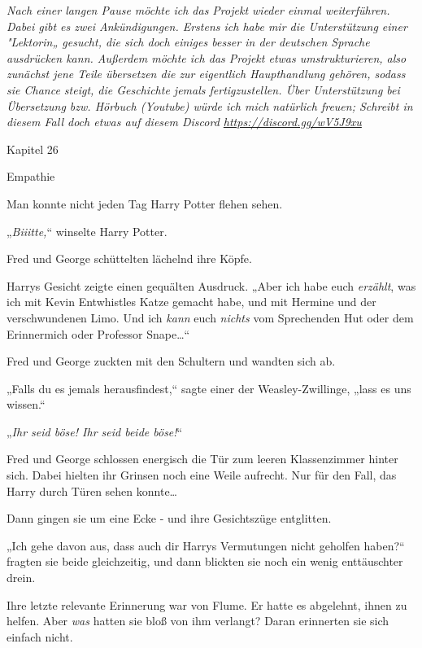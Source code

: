 

\hypertarget{empathie}{%

\emph{Nach einer langen Pause möchte ich das Projekt wieder einmal weiterführen. Dabei gibt es zwei Ankündigungen. Erstens ich habe mir die Unterstützung einer "Lektorin„ gesucht, die sich doch einiges besser in der deutschen Sprache ausdrücken kann. Außerdem möchte ich das Projekt etwas umstrukturieren, also zunächst jene Teile übersetzen die zur eigentlich Haupthandlung gehören, sodass sie Chance steigt, die Geschichte jemals fertigzustellen. Über Unterstützung bei Übersetzung bzw. Hörbuch (Youtube) würde ich mich natürlich freuen; Schreibt in diesem Fall doch etwas auf diesem Discord \url{https://discord.gg/wV5J9xu} ~}

Kapitel 26

Empathie

Man konnte nicht jeden Tag Harry Potter flehen sehen.

„\emph{Biiitte,}“ winselte Harry Potter.

Fred und George schüttelten lächelnd ihre Köpfe.

Harrys Gesicht zeigte einen gequälten Ausdruck. „Aber ich habe euch \emph{erzählt}, was ich mit Kevin Entwhistles Katze gemacht habe, und mit Hermine und der verschwundenen Limo. Und ich \emph{kann} euch \emph{nichts} vom Sprechenden Hut oder dem Erinnermich oder Professor Snape…“

Fred und George zuckten mit den Schultern und wandten sich ab.

„Falls du es jemals herausfindest,“ sagte einer der Weasley-Zwillinge, „lass es uns wissen.“

„\emph{Ihr seid böse! Ihr seid beide böse!}“

Fred und George schlossen energisch die Tür zum leeren Klassenzimmer hinter sich. Dabei hielten ihr Grinsen noch eine Weile aufrecht. Nur für den Fall, das Harry durch Türen sehen konnte…

Dann gingen sie um eine Ecke - und ihre Gesichtszüge entglitten.

„Ich gehe davon aus, dass auch dir Harrys Vermutungen \later nicht geholfen haben?“ fragten sie beide gleichzeitig, und dann blickten sie noch ein wenig enttäuschter drein.

Ihre letzte relevante Erinnerung war von Flume. Er hatte es abgelehnt, ihnen zu helfen. Aber \emph{was} hatten sie bloß von ihm verlangt? Daran erinnerten sie sich einfach nicht.

}
